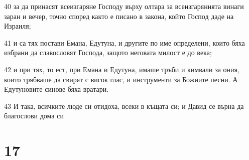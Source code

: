 \par 40 за да принасят всеизгаряне Господу върху олтара за всеизгарянията винаги заран и вечер, точно според както е писано в закона, който Господ даде на Израиля;
\par 41 и са тях постави Емана, Едутуна, и другите по име определени, които бяха избрани да славословят Господа, защото неговата милост е до века;
\par 42 и при тях, то ест, при Емана и Едутуна, имаше тръби и кимвали за ония, които трябваше да свирят с висок глас, и инструменти за Божиите песни. А Едутуновите синове бяха вратари.
\par 43 И така, всичките люде си отидоха, всеки в къщата си; и Давид се върна да благослови дома си

\chapter{17}

